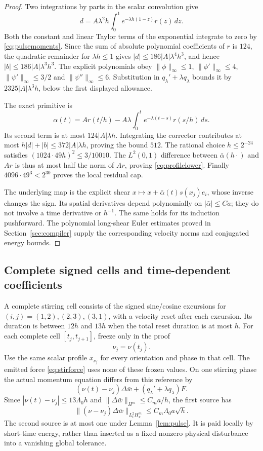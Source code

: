 \documentclass[11pt,a4paper]{amsart}
\theoremstyle{definition}
\theoremstyle{remark}
\numberwithin{equation}{section}
\newcommand{\norm}[1]{\lVert #1\rVert}
\begin{document}
\begin{proof}
Two integrations by parts in the scalar convolution give
\[
 d=A\lambda^2h\int_0^1e^{-\lambda h(1-z)}r(z)\,dz.
\]
Both the constant and linear Taylor terms of the exponential integrate to zero by \eqref{eq:pulsemoments}. Since the sum of absolute polynomial coefficients of $r$ is $124$, the quadratic remainder for $\lambda h\le1$ gives
$|d|\le186|A|\lambda^4h^3$, and hence
$|b|\le186|A|\lambda^3h^3$.
The explicit polynomials obey
$\|\phi\|_\infty\le1$, $\|\phi'\|_\infty\le4$,
$\|\psi'\|_\infty\le3/2$ and $\|\psi''\|_\infty\le6$.
Substitution in $q_\lambda'+\lambda q_\lambda$ bounds it by
$2325|A|\lambda^3h$, below the first displayed allowance.

The exact primitive is
\[
 \alpha(t)=Ar(t/h)-A\lambda\int_0^t e^{-\lambda(t-s)}r(s/h)\,ds.
\]
Its second term is at most $124|A|\lambda h$. Integrating the corrector contributes at most $h|d|+|b|\le372|A|\lambda h$, proving the bound $512$.
The rational choice $h\le2^{-24}$ satisfies
$(1024\cdot49h)^2\le3/10010$. The $L^2(0,1)$ difference between $\bar\alpha(h\cdot)$ and $Ar$ is thus at most half the norm of $Ar$, proving \eqref{eq:profilelower}. Finally $4096\cdot49^3<2^{30}$ proves the local residual cap.

The underlying map is the explicit shear
$x\mapsto x+\bar\alpha(t)s(x_j)e_i$, whose inverse changes the sign. Its spatial derivatives depend polynomially on $|\bar\alpha|\le C a$; they do not involve a time derivative or $h^{-1}$. The same holds for its induction pushforward. The polynomial long-shear Euler estimates proved in Section~\ref{sec:compiler} supply the corresponding velocity norms and conjugated energy bounds.
\end{proof}

\subsection{Complete signed cells and time-dependent coefficients}
A complete stirring cell consists of the signed sine/cosine excursions for
$(i,j)=(1,2),(2,3),(3,1)$, with a velocity reset after each excursion. Its duration is between $12h$ and $13h$ when the total reset duration is at most $h$. For each complete cell $[t_j,t_{j+1}]$, freeze only in the proof
\[
 \nu_j=\nu(t_j).
\]
Use the same scalar profile $\bar x_{\nu_j}$ for every orientation and phase in that cell. The emitted force \eqref{eq:stirforce} uses none of these frozen values.
On one stirring phase the actual momentum equation differs from this reference by
\[
 (\nu(t)-\nu_j)\Delta\bar w+(q_\lambda'+\lambda q_\lambda)F.
\]
Since $|\nu(t)-\nu_j|\le13\Lambda_0h$ and $\|\Delta\bar w\|_{H^m}\le C_ma/h$, the first source has
\begin{equation}\label{eq:stirfreeze}
 \norm{(\nu-\nu_j)\Delta\bar w}_{L^2_tH^m_x}
 \le C_m\Lambda_0a\sqrt h.
\end{equation}
The second source is at most one under Lemma~\ref{lem:pulse}. It is paid locally by short-time energy, rather than inserted as a fixed nonzero physical disturbance into a vanishing global tolerance.
\end{document}
